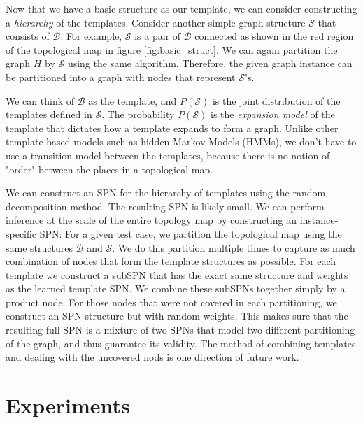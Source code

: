 \documentclass[10pt, titlepage]{article}
\theoremstyle{definition}
\begin{document}
Now that we have a basic structure as our template, we can consider constructing a \textit{hierarchy} of the templates. Consider another simple graph structure $\mathcal{S}$ that consists of $\mathcal{B}$. For example, $\mathcal{S}$ is a pair of $\mathcal{B}$ connected as shown in the red region of the topological map in figure \ref{fig:basic_struct}. We can again partition the graph $H$ by $\mathcal{S}$ using the same algorithm. Therefore, the given graph instance can be partitioned into a graph with nodes that represent $\mathcal{S}$'s.

We can think of $\mathcal{B}$ as the template, and $P(\mathcal{S})$ is the joint distribution of the templates defined in $\mathcal{S}$. The probability $P(\mathcal{S})$ is the \textit{expansion model} of the template that dictates how a template expands to form a graph. Unlike other template-based models such as hidden Markov Models (HMMs), we don't have to use a transition model between the templates, because there is no notion of "order" between the places in a topological map.

We can construct an SPN for the hierarchy of templates using the random-decomposition method. The resulting SPN is likely small. We can perform inference at the scale of the entire topology map by constructing an instance-specific SPN: For a given test case, we partition the topological map using the same structures $\mathcal{B}$ and $\mathcal{S}$. We do this partition multiple times to capture as much combination of nodes that form the template structures as possible. For each template we construct a subSPN that has the exact same structure and weights as the learned template SPN. We combine these subSPNs together simply by a product node. For those nodes that were not covered in each partitioning, we construct an SPN structure but with random weights. This makes sure that the resulting full SPN is a mixture of two SPNs that model two different partitioning of the graph, and thus guarantee its validity. The method of combining templates and dealing with the uncovered nods is one direction of future work.

\section{Experiments}\label{section:experiment}
\end{document}
